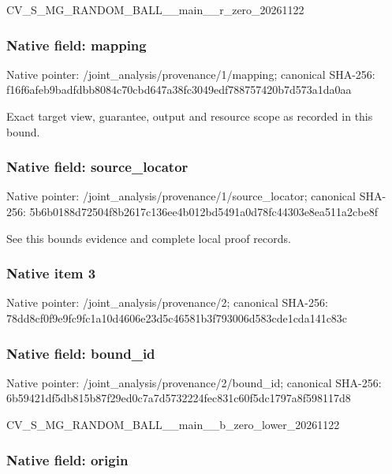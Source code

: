 \documentclass[10pt,a4paper]{article}
\begin{document}
CV\_S\_MG\_RANDOM\_BALL\_\_mai\allowbreak{}n\_\_r\_zero\_20261122


\subsubsection{Native field: mapping}


Native pointer: /joint\_analysis/provenance/1/mapping; canonical SHA-256: f16f6afeb9badfdbb8084c70\allowbreak{}cbd647a38fc3049edf788757\allowbreak{}420b7d573a1da0aa


Exact target view, guarantee, output and resource scope as recorded in this bound.


\subsubsection{Native field: source\_locator}


Native pointer: /joint\_analysis/provenan\allowbreak{}ce/1/source\_locator; canonical SHA-256: 5b6b0188d72504f8b2617c13\allowbreak{}6ee4b012bd5491a0d78fc443\allowbreak{}03e8ea511a2cbe8f


See this bounds evidence and complete local proof records.


\subsubsection{Native item 3}


Native pointer: /joint\_analysis/provenance/2; canonical SHA-256: 78dd8cf0f9e9fc9fc1a10d46\allowbreak{}06e23d5c46581b3f793006d5\allowbreak{}83cde1cda141c83c



\subsubsection{Native field: bound\_id}


Native pointer: /joint\_analysis/provenance/2/bound\_id; canonical SHA-256: 6b59421df5db815b87f29ed0\allowbreak{}c7a7d5732224fec831c60f5d\allowbreak{}c1797a8f598117d8


CV\_S\_MG\_RANDOM\_BALL\_\_mai\allowbreak{}n\_\_b\_zero\_lower\_20261122


\subsubsection{Native field: origin}
\end{document}
